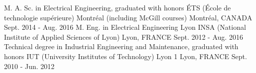 

\begin{cventries}


\cventry
{M. A. Sc. in Electrical Engineering, graduated with honors} %
{ÉTS (École de technologie supérieure) Montréal (including McGill courses)} %
{Montréal, CANADA} %
{Sept. 2014 - Aug. 2016} %
{ %
}
\vspace{-1.5mm}
\cventry
{M. Eng. in Electrical Engineering} %
{Lyon INSA (National Institute of Applied Sciences of Lyon)} %
{Lyon, FRANCE} %
{Sept. 2012 - Aug. 2016} %
{ %
}
\vspace{-1mm}
\cventry
{Technical degree in Industrial Engineering and Maintenance, graduated with honors} %
{IUT (University Institutes of Technology) Lyon 1} %
{Lyon, FRANCE} %
{Sept. 2010 - Jun. 2012} %
{ %
}
\vspace{-5mm}
\end{cventries}